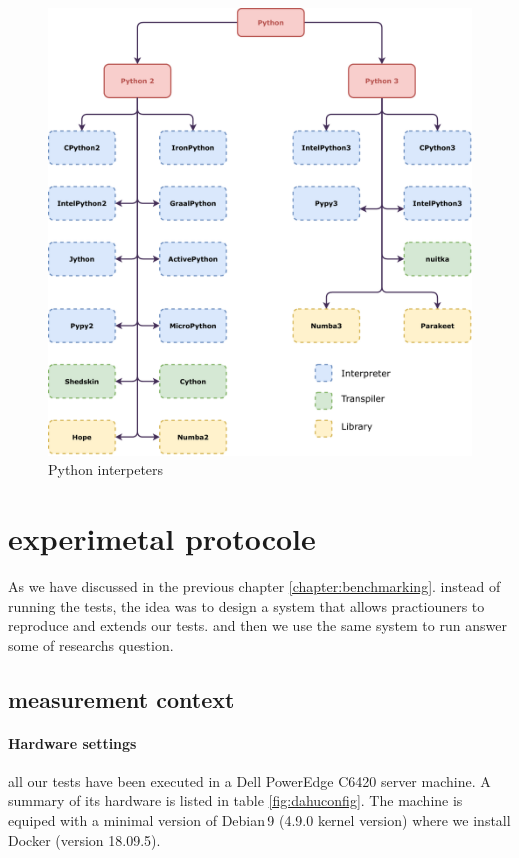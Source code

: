 \begin{figure}[thb]
    \centering
    \includegraphics[width=\linewidth]{imgs/python-implementations-tree}
    \caption{Python interpeters}
    \label{fig:interpreters}
\end{figure}

\section{experimetal protocole}

As we have discussed in the previous chapter \ref{chapter:benchmarking}. instead of running the tests, the idea was to design a system that allows practiouners to reproduce and extends our tests. and then we use the same system to run answer some of researchs question.
\subsection{measurement context}
\paragraph{Hardware settings}

all our tests have been executed in a Dell PowerEdge C6420 server machine. A summary of its hardware is listed in table \ref{fig:dahuconfig}. The machine is equiped with a minimal version of Debian\,9 (4.9.0 kernel version) where we install Docker (version 18.09.5).



